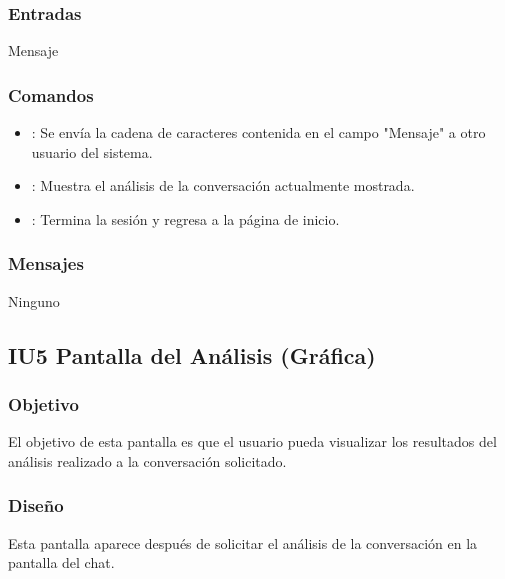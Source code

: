 \subsubsection{Entradas}
\begin{Citemize}

\item Mensaje 

\end{Citemize}
\subsubsection{Comandos}
\begin{itemize}
	\item {}: Se env\'ia la cadena de caracteres contenida en el campo "Mensaje" a otro usuario del sistema. 
	\item {}: Muestra el an\'alisis de la conversaci\'on actualmente mostrada.
		\item {}: Termina la sesi\'on y regresa a la p\'agina de inicio.
	\end{itemize}

\subsubsection{Mensajes}
Ninguno




	\pagebreak%

	
	
	
	
			\subsection{IU5 Pantalla del An\'alisis (Gr\'afica)}

\subsubsection{Objetivo}
	El objetivo de esta pantalla es que el usuario pueda visualizar los resultados del an\'alisis realizado a la conversaci\'on solicitado.

\subsubsection{Dise\~no}
	Esta pantalla aparece despu\'es de solicitar el an\'alisis de la conversaci\'on en la pantalla del chat.

